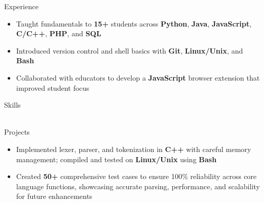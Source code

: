 \documentclass{resume}
\begin{document}
\begin{experienceSection}{Experience}
    \experienceItem[
        company={theCoderSchool},
        location={Berkeley Heights, NJ},
        position={Code Tutor},
        duration={March 2024 - August 2024}
    ]
    \begin{itemize}[itemsep=-6pt, leftmargin=2em, rightmargin=0.8em, before=\raggedright, after=\normalfont]
        \item Taught fundamentals to \textbf{15+} students across \textbf{Python}, \textbf{Java}, \textbf{JavaScript}, \textbf{C/C++}, \textbf{PHP}, and \textbf{SQL}
        \item Introduced version control and shell basics with \textbf{Git}, \textbf{Linux/Unix}, and \textbf{Bash}
        \item Collaborated with educators to develop a \textbf{JavaScript} browser extension that improved student focus
    \end{itemize}

\end{experienceSection}

\begin{skillsSection}{Skills}
    \skillItem[
        category={Languages},
        skills={Python, C, C++, JavaScript, TypeScript, Java, PHP, SQL}
    ] \\
    \skillItem[
        category={Full-Stack},
        skills={React, Next.js, Vue, Node.js, MongoDB, Zustand, Tailwind, Slack SDK, Zendesk API}
    ] \\
    \skillItem[
        category={DevOps \& Tooling},
        skills={AWS, Datadog, Kubernetes, Terraform, ArgoCD, CircleCI, Git, Bash}
    ]
\end{skillsSection}

\begin{experienceSection}{Projects}
    \projectItem[
        title={Mini C-Like Programming Language},
    ]
    \vspace{-0.5em}
    \begin{itemize}[topsep=0pt, itemsep=-6pt, leftmargin=2em, rightmargin=0.8em, before=\raggedright, after=\normalfont]
        \item Implemented lexer, parser, and tokenization in \textbf{C++} with careful memory management; compiled and tested on \textbf{Linux/Unix} using \textbf{Bash}
        \item Created \textbf{50+} comprehensive test cases to ensure 100\% reliability across core language functions, showcasing accurate parsing, performance, and scalability for future enhancements
    \end{itemize}
\end{experienceSection}
\end{document}
